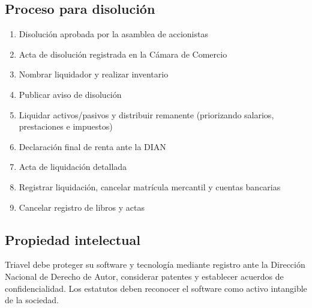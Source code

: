 \subsection*{Proceso para disolución}
\begin{enumerate}
    \item Disolución aprobada por la asamblea de accionistas
    \item Acta de disolución registrada en la Cámara de Comercio
    \item Nombrar liquidador y realizar inventario
    \item Publicar aviso de disolución
    \item Liquidar activos/pasivos y distribuir remanente (priorizando salarios, prestaciones e impuestos)
    \item Declaración final de renta ante la DIAN
    \item Acta de liquidación detallada
    \item Registrar liquidación, cancelar matrícula mercantil y cuentas bancarias
    \item Cancelar registro de libros y actas
\end{enumerate}

\subsection*{Propiedad intelectual}
Triavel debe proteger su software y tecnología mediante registro ante la Dirección Nacional de Derecho de Autor, considerar patentes y establecer acuerdos de confidencialidad. Los estatutos deben reconocer el software como activo intangible de la sociedad.
